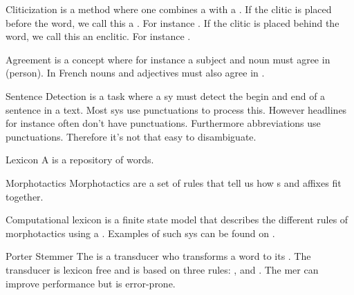 \begin{df}{Cliticization}
\sb{} is a method where one combines a  with a . If the clitic is placed before the word, we call this a . For instance . If the clitic is placed behind the word, we call this an enclitic. For instance .
\end{df}
\begin{df}{Agreement}
\sb{} is a concept where for instance a subject and noun must agree in  (person). In French nouns and adjectives must also agree in .
\end{df}
\begin{df}{Sentence Detection}
\sb{} is a task where a sy must detect the begin and end of a sentence in a text. Most sys use punctuations to process this. However headlines for instance often don't have punctuations. Furthermore abbreviations use punctuations. Therefore it's not that easy to disambiguate.
\end{df}
\begin{df}{Lexicon}
A \sb{} is a repository of words.
\end{df}
\begin{df}{Morphotactics}
Morphotactics are a set of rules that tell us how s and affixes fit together.
\end{df}
\begin{df}{Computational lexicon}
\sb{} is a finite state model that describes the different rules of morphotactics using a . Examples of such sys can be found on .
\end{df}
\begin{df}{Porter Stemmer}
The \sb{} is a transducer who transforms a word to its . The transducer is lexicon free and is based on three rules: ,  and . The mer can improve performance but is error-prone.
\end{df}
